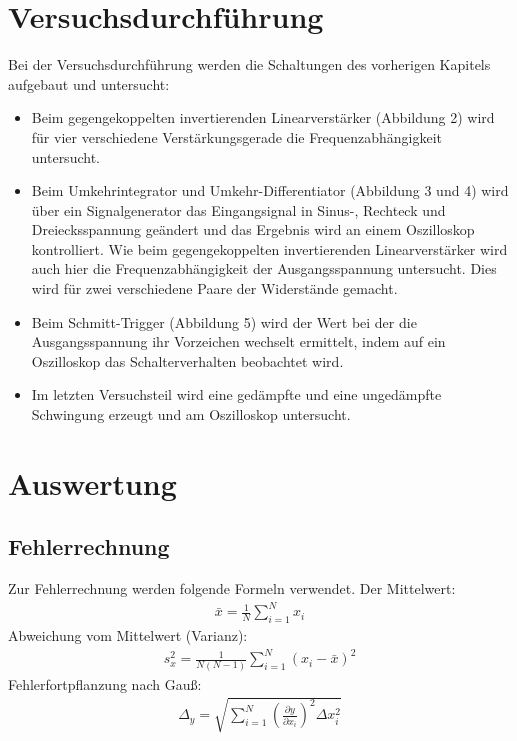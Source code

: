 \documentclass{scrartcl}
\begin{document}
\section{Versuchsdurchführung}
\label{sec:Durchführung}
Bei der Versuchsdurchführung werden die Schaltungen des vorherigen Kapitels aufgebaut und untersucht:
\begin{itemize}
\item Beim gegengekoppelten invertierenden Linearverstärker (Abbildung 2) wird für vier verschiedene Verstärkungsgerade die Frequenzabhängigkeit untersucht.
\item Beim Umkehrintegrator und Umkehr-Differentiator (Abbildung 3 und 4) wird über ein Signalgenerator das Eingangsignal in Sinus-, Rechteck und Dreiecksspannung geändert und das Ergebnis wird an einem Oszilloskop kontrolliert. Wie beim gegengekoppelten invertierenden Linearverstärker wird auch hier die Frequenzabhängigkeit der Ausgangsspannung untersucht.
Dies wird für zwei verschiedene Paare der Widerstände gemacht.
\item Beim Schmitt-Trigger (Abbildung 5) wird der Wert bei der die Ausgangsspannung ihr Vorzeichen wechselt ermittelt, indem auf ein Oszilloskop das Schalterverhalten beobachtet wird.
\item Im letzten Versuchsteil wird eine gedämpfte und eine ungedämpfte Schwingung erzeugt und am Oszilloskop untersucht.
\end{itemize}



\section{Auswertung}

\subsection{Fehlerrechnung}
Zur Fehlerrechnung werden folgende Formeln verwendet.
Der Mittelwert:
\begin{align}
\bar{x} = \frac{1}{N} \sum_{i=1}^N x_i
\end{align}
Abweichung vom Mittelwert (Varianz):
\begin{align}
s_x^2 = \frac{1}{N(N-1)} \sum_{i=1}^N (x_i - \bar{x})^2
\end{align}
Fehlerfortpflanzung nach Gauß:
\begin{align}
\Delta_y = \sqrt{\sum_{i=1}^N \left(\frac{\partial y}{\partial x_i}\right)^2 \Delta x_i^2}
\end{align}
\end{document}
